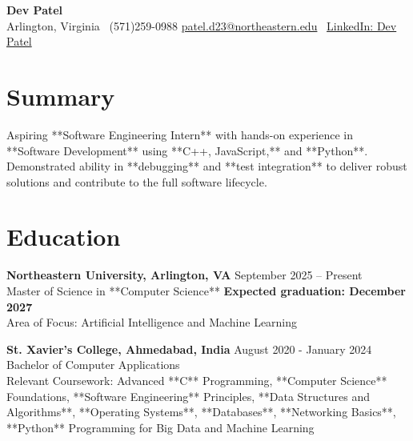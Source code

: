 \documentclass[a4paper,10pt]{article}
\begin{document}
\begin{center}
\vspace{-3mm}
    \fontsize{16}{18}\selectfont \textbf{Dev Patel} \\
    \vspace{0mm}
    \normalsize Arlington, Virginia \textbar\ (571)259-0988  \textbar       \href{mailto:patel.d23@northeastern.edu}{patel.d23@northeastern.edu} \textbar\ \href{https://www.linkedin.com/in/devxpatel//}{LinkedIn: Dev Patel} \\
\end{center}

\section*{Summary}
Aspiring **Software Engineering Intern** with hands-on experience in **Software Development** using **C++, JavaScript,** and **Python**. Demonstrated ability in **debugging** and **test integration** to deliver robust solutions and contribute to the full software lifecycle.

\vspace{ 0 mm}
\section*{Education}
\textbf{Northeastern University, Arlington, VA} \hfill September 2025 -- Present\\
Master of Science in **Computer Science** \hfill \textbf{Expected graduation: December 2027} \\
Area of Focus: Artificial Intelligence and Machine Learning

\vspace{1 mm} %
\textbf{St. Xavier's College, Ahmedabad, India} \hfill August 2020 - January 2024 \\
Bachelor of Computer Applications\\
Relevant Coursework: Advanced **C** Programming, **Computer Science** Foundations, **Software Engineering** Principles, **Data Structures and Algorithms**, **Operating Systems**, **Databases**, **Networking Basics**, **Python** Programming for Big Data and Machine Learning
\end{document}
